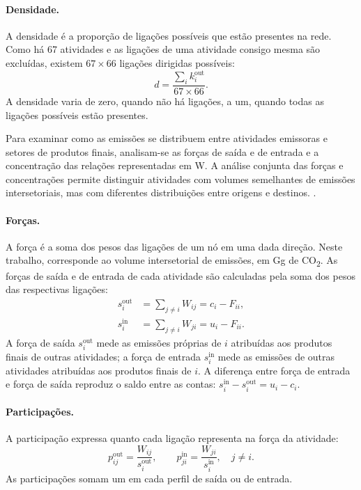 \paragraph{Densidade.}
A densidade é a proporção de ligações possíveis que estão presentes na rede. Como há 67 atividades e as ligações de uma atividade consigo mesma são excluídas, existem $67\times66$ ligações dirigidas possíveis:
\begin{equation}
d=\frac{\sum_i k_i^{\mathrm{out}}}{67\times66}.
\label{eq:densidade-rede}
\end{equation}
A densidade varia de zero, quando não há ligações, a um, quando todas as ligações possíveis estão presentes.

Para examinar como as emissões se distribuem entre atividades emissoras e setores de produtos finais, analisam-se as forças de saída e de entrada e a concentração das relações representadas em W. A análise conjunta das forças e concentrações permite distinguir atividades com volumes semelhantes de emissões intersetoriais, mas com diferentes distribuições entre origens e destinos. \parencite{huang2019,serrano2009}.

\paragraph{Forças.}
A força é a soma dos pesos das ligações de um nó em uma dada direção. Neste trabalho, corresponde ao volume intersetorial de emissões, em Gg de CO\textsubscript{2}.
As forças de saída e de entrada de cada atividade são calculadas pela soma dos pesos das respectivas ligações:
\begin{equation}
\begin{aligned}
s_i^{\mathrm{out}}&=\sum_{j\ne i}W_{ij}=c_i-F_{ii},\\
s_i^{\mathrm{in}}&=\sum_{j\ne i}W_{ji}=u_i-F_{ii}.
\end{aligned}
\label{eq:forcas-externas}
\end{equation}
A força de saída $s_i^{\mathrm{out}}$ mede as emissões próprias de $i$ atribuídas aos produtos finais de outras atividades; a força de entrada $s_i^{\mathrm{in}}$ mede as emissões de outras atividades atribuídas aos produtos finais de $i$. A diferença entre força de entrada e força de saída reproduz o saldo entre as contas: $s_i^{\mathrm{in}}-s_i^{\mathrm{out}}=u_i-c_i$.

\paragraph{Participações.}
A participação expressa quanto cada ligação representa na força da atividade:
\begin{equation}
p_{ij}^{\mathrm{out}}=\frac{W_{ij}}{s_i^{\mathrm{out}}},\qquad
p_{ji}^{\mathrm{in}}=\frac{W_{ji}}{s_i^{\mathrm{in}}},\quad j\ne i.
\label{eq:participacoes-externas}
\end{equation}
As participações somam um em cada perfil de saída ou de entrada.


